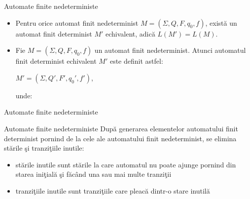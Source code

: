 \documentclass[pdf]{beamer}
\begin{document}
\begin{frame}{Automate finite nedeterministe}
\begin{itemize}
\item
Pentru orice automat finit nedeterminist $M=(\Sigma, Q, F, q_{0}, f)$, există un automat finit determinist $M'$ echivalent, adică $L(M') = L(M).$
\item
Fie $M=(\Sigma, Q, F, q_{0}, f)$ un automat finit nedeterminist. Atunci automatul finit determinist echivalent $M'$ este definit astfel:

$M'=(\Sigma, Q', F', q_{0}', f')$, 

unde:
\end{itemize}
\end{frame}



\begin{frame}{Automate finite nedeterministe}
\begin{center}
\end{center}
\end{frame}



\begin{frame}{Automate finite nedeterministe}
După generarea elementelor automatului finit determinist pornind de la cele ale automatului finit nedeterminist, se elimina stările şi tranziţiile inutile:
\begin{itemize}
\item
stările inutile sunt stările la care automatul nu poate ajunge pornind din starea iniţială şi făcând una sau mai multe tranziţii
\item
tranziţiile inutile sunt tranziţiile care pleacă dintr-o stare inutilă
\end{itemize}
\end{frame}
\end{document}
